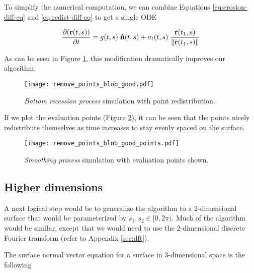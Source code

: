 To simplify the numerical computation, we can combine Equations \ref{eq:erosion-diff-eq} and \ref{eq:redist-diff-eq} to get a single ODE

\begin{equation}
  \frac{\partial (\bvec{r}(t, s))}{\partial t} = g(t, s) \; \bhat{n}(t, s) + a_t(t, s) \; \frac{\dot{\bvec{r}}(t_1, s)}{\norm{\dot{\bvec{r}}(t_1, s)}}
\end{equation}

As can be seen in Figure \ref{fig:remove-points-blob-good}, this modification dramatically improves our algorithm.

\begin{figure}[H]
    \begin{center}
      \texttt{[image: remove\_points\_blob\_good.pdf]}
    \end{center}
  \vspace{-.2in} %
  \caption{\label{fig:remove-points-blob-good}\textit{Bottom recession process} simulation with point redistribution.}
\end{figure}

If we plot the evaluation points (Figure \ref{fig:remove-points-blob-good-points}), it can be seen that the points nicely redistribute themselves as time increases to stay evenly spaced on the surface.

\begin{figure}[H]
    \begin{center}
      \texttt{[image: remove\_points\_blob\_good\_points.pdf]}
    \end{center}
  \vspace{-.2in} %
  \caption{\label{fig:remove-points-blob-good-points}\textit{Smoothing process} simulation with evaluation points shown.}
\end{figure}

\subsection*{Higher dimensions}

A next logical step would be to generalize the algorithm to a 2-dimensional surface that would be parameterized by $s_1, s_2 \in [0, 2\pi)$. Much of the algorithm would be similar, except that we would need to use the 2-dimensional discrete Fourier transform (refer to Appendix \ref{sec:dft}).

The surface normal vector equation for a surface in 3-dimensional space is the following

